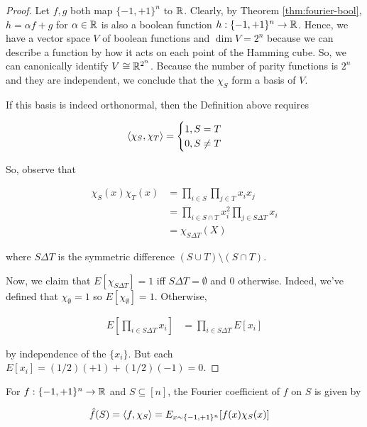 \documentclass[main.tex]{subfiles}
\begin{document}
\begin{proof}
Let $f, g$ both map $\{-1, +1\}^n$ to $\mathbb{R}$. Clearly, by Theorem \ref{thm:fourier-bool}, $h = \alpha f + g$ for $\alpha \in \mathbb{R}$ is also a boolean function $h: \{-1, +1\}^n \rightarrow \mathbb{R}$. Hence, we have a vector space $V$ of boolean functions and $\dim V = 2^n$ because we can describe a function by how it acts on each point of the Hamming cube. So, we can canonically identify $V \cong \mathbb{R}^{2^n}$. Because the number of parity functions is $2^n$ and they are independent, we conclude that the $\chi_S$ form a basis of $V$.

If this basis is indeed orthonormal, then the Definition above requires 

\begin{align*}
\langle \chi_S, \chi_T \rangle &= \begin{cases}
 	1, S = T\\
 	0, S \neq T
 \end{cases}
\end{align*}

So, observe that 

\begin{align*}
\chi_S(x) \chi_T(x)	&= \prod_{i\in S} \prod_{j\in T} x_ix_j \\
&= \prod_{i\in S \cap T} x_i^2 \prod_{j\in S \Delta T} x_i \\
&= \chi_{S \Delta T}(X) 
\end{align*}

where $S \Delta T$ is the symmetric difference $(S \cup T) \setminus (S\cap T)$. 

Now, we claim that $E[\chi_{S \Delta T}] = 1$ iff $S \Delta T = \emptyset$ and $0$ otherwise. Indeed, we've defined that $\chi_{\emptyset} = 1$ so $E[\chi_{\emptyset}] = 1$. Otherwise,

\begin{align*}
E[\prod_{i \in S \Delta T} x_i ]	 &= \prod_{i \in S \Delta T} E[ x_i ]
\end{align*}

by independence of the $\{x_i\}$. But each $E[ x_i ] = (1/2) (+1) + (1/2) (-1) = 0$.
\end{proof}

\begin{proposition}
For $f: \{ -1, +1\}^n \rightarrow \mathbb{R}$ and $S \subseteq [n]$, the Fourier coefficient of $f$ on $S$ is given by

\begin{align*}
\hat{f}(S) &= \langle f, \chi_S\rangle = E_{x \sim \{-1, +1\}^n}[f(x) \chi_S(x)]	
\end{align*}
\end{proposition}
\end{document}
